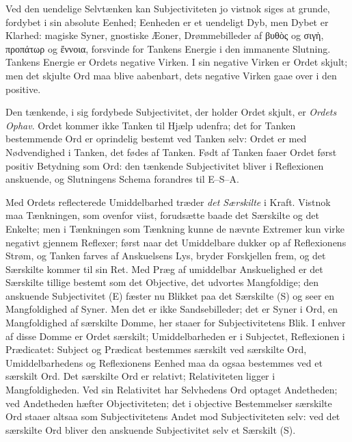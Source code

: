 \documentclass[12pt]{book}
\newcommand{\opage}[1]{\marginnote{\footnotesize\textit{[#1]}}}
\begin{document}
Ved den uendelige Selvtænken kan Subjectiviteten jo vistnok siges at grunde, fordybet i sin absolute Eenhed; Eenheden er et uendeligt Dyb, men Dybet er Klarhed: magiske Syner, gnostiske Æoner, Drømmebilleder af βυθὸς og σιγὴ, προπάτωρ og ἔννοια, forsvinde for Tankens Energie i den immanente Slutning. Tankens Energie er Ordets negative Virken. I sin negative Virken er Ordet skjult; men det skjulte Ord maa blive aabenbart, dets negative Virken gaae over i den positive.

Den tænkende, i sig fordybede Subjectivitet, der holder Ordet skjult, er \emph{Ordets Ophav}. Ordet kommer ikke Tanken til Hjælp udenfra; det for Tanken bestemmende Ord er oprindelig bestemt ved Tanken selv: Ordet er med Nødvendighed i Tanken, det fødes af Tanken. Født af Tanken faaer Ordet først positiv Betydning som Ord: den tænkende Subjectivitet bliver i Reflexionen anskuende, og Slutningens Schema forandres til E--S--A.

Med Ordets reflecterede Umiddelbarhed træder \emph{det Særskilte} i Kraft. Vistnok maa Tænkningen, som ovenfor viist, forudsætte baade det Særskilte og det Enkelte; men i Tænkningen som Tænkning kunne de nævnte Extremer kun virke negativt gjennem Reflexer; først naar det Umiddelbare dukker op af Reflexionens Strøm, og Tanken farves af Anskuelsens Lys, bryder Forskjellen frem, og det Særskilte kommer til sin Ret. Med Præg af umiddelbar Anskuelighed er det Særskilte tillige bestemt som det Objective, det udvortes Mangfoldige; den anskuende Subjectivitet (E) fæster nu Blikket paa det Særskilte (S) og seer en Mangfoldighed af Syner. Men det er ikke Sandsebilleder; det er Syner i Ord, en Mangfoldighed af særskilte Domme, her staaer for Subjectivitetens Blik. I enhver af disse Domme er Ordet særskilt; Umiddelbarheden er i Subjectet, Reflexionen i Prædicatet: Subject
\opage{340}og Prædicat bestemmes særskilt ved særskilte Ord, Umiddelbarhedens og Reflexionens Eenhed maa da ogsaa bestemmes ved et særskilt Ord. Det særskilte Ord er relativt; Relativiteten ligger i Mangfoldigheden. Ved sin Relativitet har Selvhedens Ord optaget Andetheden; ved Andetheden hæfter Objectiviteten; det i objective Bestemmelser særskilte Ord staaer altsaa som Subjectivitetens Andet mod Subjectiviteten selv: ved det særskilte Ord bliver den anskuende Subjectivitet selv et Særskilt (S).
\end{document}
